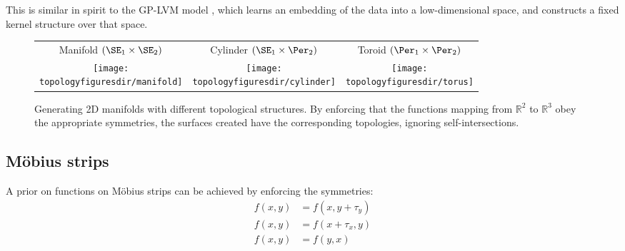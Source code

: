 This is similar in spirit to the GP-LVM model \cite{lawrence2005probabilistic}, which learns an embedding of the data into a low-dimensional space, and constructs a fixed kernel structure over that space.


\begin{figure}
\begin{tabular}{ccc}
Manifold $( \SE_1 \times \SE_2 )$  & Cylinder $( \SE_1 \times \Per_2 )$ & Toroid $( \Per_1 \times \Per_2 )$\\
\texttt{[image: \\topologyfiguresdir/manifold]} &
\texttt{[image: \\topologyfiguresdir/cylinder]} &
\texttt{[image: \\topologyfiguresdir/torus]} \\
\end{tabular}
\caption[Generating 2D manifolds with different topological structures]{Generating 2D manifolds with different topological structures.  By enforcing that the functions mapping from $\mathbb{R}^2$ to $\mathbb{R}^3$ obey the appropriate symmetries, the surfaces created have the corresponding topologies, ignoring self-intersections.}
\label{fig:gen_surf}
\end{figure}



\subsection{M\"{o}bius strips}

A prior on functions on M\"{o}bius strips can be achieved by enforcing the symmetries:
%
\begin{align}
f(x, y) & = f( x, y + \tau_y) \\
f(x, y) & = f( x + \tau_x, y)  \\
f(x, y) & = f( y, x )
\end{align}

